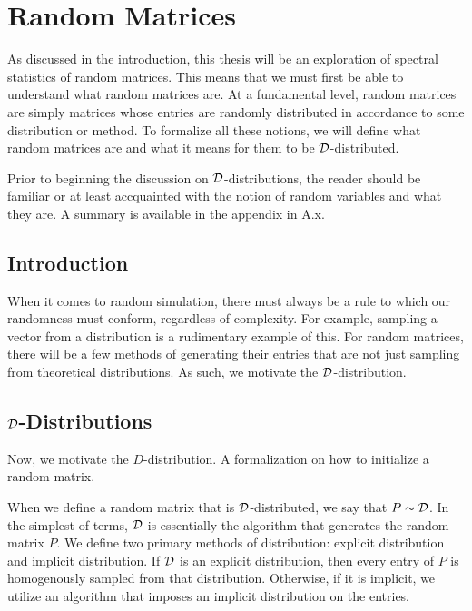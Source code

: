 \chapter{Random Matrices}

As discussed in the introduction, this thesis will be an exploration of spectral statistics of random matrices. This means that we must first be able to understand what random matrices are. At a fundamental level, random matrices are simply matrices whose entries are randomly distributed in accordance to some distribution or method. To formalize all these notions, we will define what random matrices are and what it means for them to be $\D$-distributed.

Prior to beginning the discussion on $\D$-distributions, the reader should be familiar or at least accquainted with the notion of random variables and what they are. A summary is available in the appendix in A.x. 

\section{Introduction}
When it comes to random simulation, there must always be a rule to which our randomness must conform, regardless of complexity. For example, sampling a vector from a distribution is a rudimentary example of this. For random matrices, there will be a few methods of generating their entries that are not just sampling from theoretical distributions. As such, we motivate the $\D$-distribution.

\section{$\D$-Distributions}

Now, we motivate the $D$-distribution. A formalization on how to initialize a random matrix. 

\begin{definition}[$\D$-distribution]
When we define a random matrix that is $\D$-distributed, we say that $P \sim \mathcal{D}$. In the simplest of terms, $\D$ is essentially the algorithm that generates the random matrix $P$. We define two primary methods of distribution: explicit distribution and implicit distribution. If $\D$ is an explicit distribution, then every entry of $P$ is homogenously sampled from that distribution. Otherwise, if it is implicit, we utilize an algorithm that imposes an implicit distribution on the entries. 
\end{definition}

